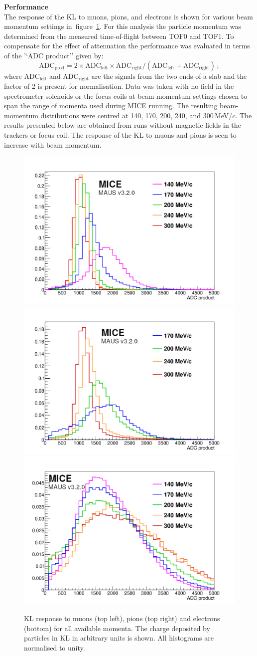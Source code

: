 \noindent\textbf{Performance} \\
\noindent
The response of the KL to muons, pions, and electrons is shown for
various beam momentum settings in~figure~\ref{fig:KL3}.
For this analysis the particle momentum was determined from the
measured time-of-flight between TOF0 and TOF1.
To compensate for the effect of attenuation the performance was
evaluated in terms of the '`ADC product'' given by:
\begin{equation}
  \text{ADC}_{\text{prod}} = 2 \times
    \text{ADC}_{\text{left}} \times \text{ADC}_{\text{right}} /
    (\text{ADC}_{\text{left}} + \text{ADC}_{\text{right}})\,;
\end{equation}
where ADC$_{\text{left}}$ and ADC$_{\text{right}}$ are the signals
from the two ends of a slab and the factor of 2 is present for
normalisation.
Data was taken with no field in the spectrometer solenoids or the
focus coils at beam-momentum settings chosen to span the range of
momenta used during MICE running.
The resulting beam-momentum distributions were centred at 140, 170,
200, 240, and 300\,MeV/$c$.
The results presented below are obtained from runs without magnetic
fields in the trackers or focus coil.
The response of the KL to muons and pions is seen to increase with
beam momentum.
\begin{figure}
  \begin{center}
    \includegraphics[width=0.45\columnwidth]{./04-KL/Figures/muon.pdf}
    \includegraphics[width=0.45\columnwidth]{./04-KL/Figures/pion.pdf}
    \includegraphics[width=0.45\columnwidth]{./04-KL/Figures/electron.pdf}
  \end{center}
  \caption{
    KL response to muons (top left), pions (top right) and electrons
    (bottom) for all available momenta.
    The charge deposited by particles in KL in arbitrary units is
    shown.
    All histograms are normalised to unity.
  }
  \label{fig:KL3}
\end{figure}
  
